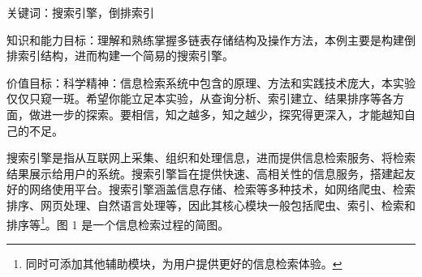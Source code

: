 \clearpage
{}
\noindent\hspace*{2em}关键词：搜索引擎，倒排索引\par
\noindent\hspace*{2em}知识和能力目标：理解和熟练掌握多链表存储结构及操作方法，本例主要是构建倒排索引结构，进而构建一个简易的搜索引擎。\par
\noindent\hspace*{2em}价值目标：科学精神：信息检索系统中包含的原理、方法和实践技术庞大，本实验仅仅只窥一斑。希望你能立足本实验，从查询分析、索引建立、结果排序等各方面，做进一步的探索。要相信，知之越多，知之越少，探究得更深入，才能越知自己的不足。\par
{}
\noindent\hspace*{2em}搜索引擎是指从互联网上采集、组织和处理信息，进而提供信息检索服务、将检索结果展示给用户的系统。搜索引擎旨在提供快速、高相关性的信息服务，搭建起友好的网络使用平台。搜索引擎涵盖信息存储、检索等多种技术，如网络爬虫、检索排序、网页处理、自然语言处理等，因此其核心模块一般包括爬虫、索引、检索和排序等\footnote{同时可添加其他辅助模块，为用户提供更好的信息检索体验。}。图 1 是一个信息检索过程的简图。\par

